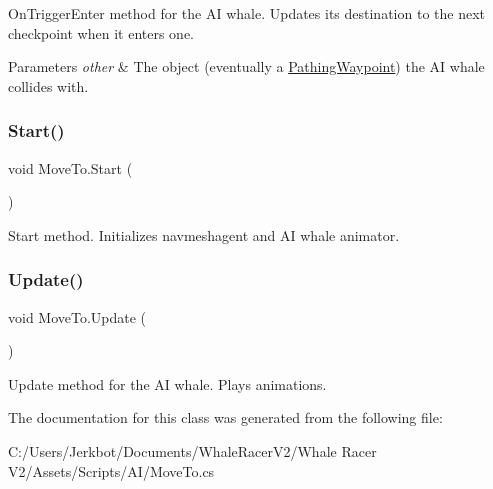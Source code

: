 On\+Trigger\+Enter method for the AI whale. Updates its destination to the next checkpoint when it enters one. 


\begin{DoxyParams}{Parameters}
{\em other} & The object (eventually a \hyperlink{class_pathing_waypoint}{Pathing\+Waypoint}) the AI whale collides with.\\
\hline
\end{DoxyParams}
\mbox{\label{class_move_to_ae802f560d398f92c7cb15ffb306f4202}} 
\subsubsection{\texorpdfstring{Start()}{Start()}}
{\footnotesize\ttfamily void Move\+To.\+Start (\begin{DoxyParamCaption}{ }\end{DoxyParamCaption})\hspace{0.3cm}{\ttfamily [private]}}



Start method. Initializes navmeshagent and AI whale animator. 

\mbox{\label{class_move_to_a4d754b4bdb8defeaf68c99a3c6b16e9c}} 
\subsubsection{\texorpdfstring{Update()}{Update()}}
{\footnotesize\ttfamily void Move\+To.\+Update (\begin{DoxyParamCaption}{ }\end{DoxyParamCaption})\hspace{0.3cm}{\ttfamily [private]}}



Update method for the AI whale. Plays animations. 



The documentation for this class was generated from the following file\+:\begin{DoxyCompactItemize}
\item 
C\+:/\+Users/\+Jerkbot/\+Documents/\+Whale\+Racer\+V2/\+Whale Racer V2/\+Assets/\+Scripts/\+A\+I/Move\+To.\+cs\end{DoxyCompactItemize}
